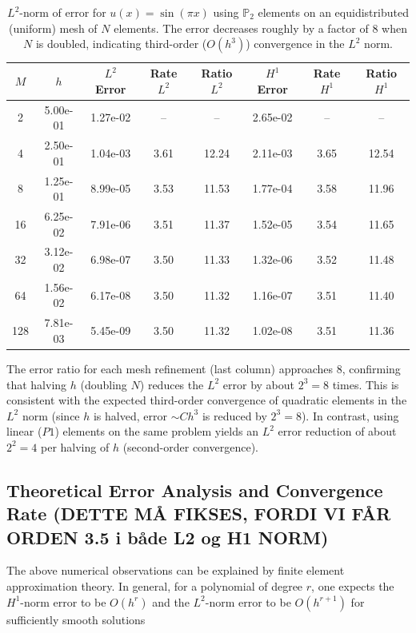 \documentclass[a4paper,10pt]{article}
\begin{document}
\begin{table}[h]
	\centering
	\begin{tabular}{|c|c|c|c|c|c|c|c|}
		\hline
		\(M\) & \(h\)    & \(L^2\) Error & Rate \(L^2\) & Ratio \(L^2\) & \(H^1\) Error & Rate \(H^1\) & Ratio \(H^1\) \\
		\hline
		2     & 5.00e-01 & 1.27e-02      & --           & --            & 2.65e-02      & --           & --            \\
		4     & 2.50e-01 & 1.04e-03      & 3.61         & 12.24         & 2.11e-03      & 3.65         & 12.54         \\
		8     & 1.25e-01 & 8.99e-05      & 3.53         & 11.53         & 1.77e-04      & 3.58         & 11.96         \\
		16    & 6.25e-02 & 7.91e-06      & 3.51         & 11.37         & 1.52e-05      & 3.54         & 11.65         \\
		32    & 3.12e-02 & 6.98e-07      & 3.50         & 11.33         & 1.32e-06      & 3.52         & 11.48         \\
		64    & 1.56e-02 & 6.17e-08      & 3.50         & 11.32         & 1.16e-07      & 3.51         & 11.40         \\
		128   & 7.81e-03 & 5.45e-09      & 3.50         & 11.32         & 1.02e-08      & 3.51         & 11.36         \\
		\hline
	\end{tabular}
	\caption{\(L^2\)-norm of error for \(u(x)=\sin(\pi x)\) using \(\mathbb{P}_2 \) elements on an equidistributed (uniform) mesh of \(N\) elements. The error decreases roughly by a factor of 8 when \(N\) is doubled, indicating third-order (\(O(h^3)\)) convergence in the \(L^2\) norm.}
	\label{tab:convergence}
\end{table}

The error ratio for each mesh refinement (last column) approaches 8, confirming that halving \(h\) (doubling \(N\)) reduces the \(L^2\) error by about \(2^3=8\) times.
This is consistent with the expected third-order convergence of quadratic elements in the \(L^2\) norm (since \(h\) is halved, error \(\sim Ch^3\) is reduced by \(2^3=8\)).
In contrast, using linear (\(P1\)) elements on the same problem yields an \(L^2\) error reduction of about \(2^2=4\) per halving of \(h\) (second-order convergence).

\subsection{Theoretical Error Analysis and Convergence Rate (DETTE MÅ FIKSES, FORDI VI FÅR ORDEN 3.5 i både L2 og H1 NORM)}
\label{sec:error_analysis}
The above numerical observations can be explained by finite element approximation theory.
In general, for a polynomial of degree \(r\), one expects the \(H^1\)-norm error to be \(O(h^r)\) and the \(L^2\)-norm error to be \(O(h^{r+1})\) for sufficiently smooth solutions
\end{document}
